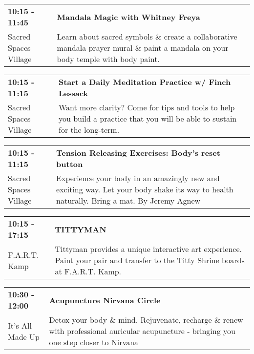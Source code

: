 \begin{tabular}{ p{1in} p{2.2in} }
    \textbf{10:15 - 11:45} & \textbf{Mandala Magic with Whitney Freya} \\
    Sacred Spaces Village \newline  & Learn about sacred symbols \& create a collaborative mandala prayer mural \& paint a mandala on your body temple with body paint. \\
    \hline 
\end{tabular}
    
\begin{tabular}{ p{1in} p{2.2in} }
    \textbf{10:15 - 11:15} & \textbf{Start a Daily Meditation Practice w/ Finch Lessack} \\
    Sacred Spaces Village \newline  & Want more clarity? Come for tips and tools to help you build a practice that you will be able to sustain for the long-term. \\
    \hline 
\end{tabular}
    
\begin{tabular}{ p{1in} p{2.2in} }
    \textbf{10:15 - 11:15} & \textbf{Tension Releasing Exercises: Body's reset button} \\
    Sacred Spaces Village \newline  & Experience your body in an amazingly new and exciting way. Let your body shake its way to health naturally. Bring a mat. By Jeremy Agnew \\
    \hline 
\end{tabular}
    
\begin{tabular}{ p{1in} p{2.2in} }
    \textbf{10:15 - 17:15} & \textbf{TITTYMAN} \\
    F.A.R.T. Kamp \newline  & Tittyman provides a unique interactive art experience. Paint your pair and transfer to the Titty Shrine boards at F.A.R.T. Kamp. \\
    \hline 
\end{tabular}
    
\begin{tabular}{ p{1in} p{2.2in} }
    \textbf{10:30 - 12:00} & \textbf{Acupuncture Nirvana Circle} \\
    It's All Made Up \newline  & Detox your body \& mind. Rejuvenate, recharge \& renew with professional auricular acupuncture - bringing you one step closer to Nirvana \\
    \hline 
\end{tabular}
    

